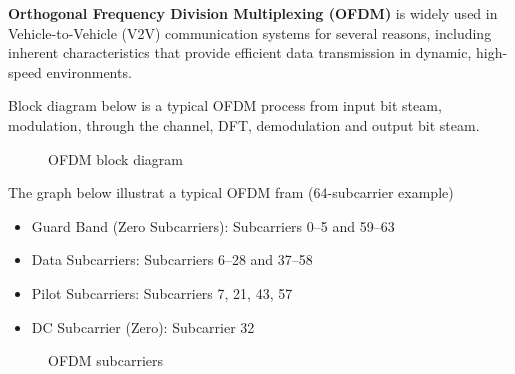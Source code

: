 \documentclass[conference]{IEEEtran}
\begin{document}
 \textbf{ Orthogonal Frequency Division Multiplexing (OFDM)} is widely used in Vehicle-to-Vehicle (V2V) communication systems for several reasons, including inherent characteristics that provide efficient data transmission in dynamic, high-speed environments.

Block diagram below is a typical OFDM process from input bit steam, modulation, through the channel, DFT, demodulation and output bit steam. 

		\begin{figure}[H]
	    		\centering
	    		\caption{OFDM block diagram}
		\end{figure}
      
      The graph below illustrat a typical OFDM fram (64-subcarrier example)
      
      	\begin{itemize}
      	\item Guard Band (Zero Subcarriers): Subcarriers 0–5 and 59–63
	\item Data Subcarriers: Subcarriers 6–28 and 37–58
	\item Pilot Subcarriers: Subcarriers 7, 21, 43, 57
	\item DC Subcarrier (Zero): Subcarrier 32
	\end{itemize}

	\begin{figure}[H]
	    		\centering
	    		\caption{OFDM subcarriers}
		\end{figure}
		
\end{document}
